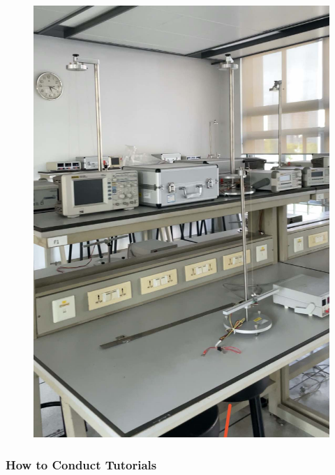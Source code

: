 \begin{minipage}[t]{0.45\textwidth}
    \begin{figure}[H]
        \includegraphics[width=0.95\columnwidth, right]{author-folder/Kai.Wu/lab.jpg}
    \end{figure}
\end{minipage}



\subsubsection{How to Conduct Tutorials}

